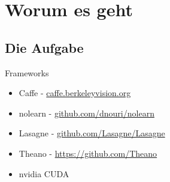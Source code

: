\section{Worum es geht}

\subsection{Die Aufgabe}


\begin{frame}{Frameworks}
    \begin{itemize}
        \item Caffe - \href{http://caffe.berkeleyvision.org/}{caffe.berkeleyvision.org}
        \item nolearn - \href{https://github.com/dnouri/nolearn}{github.com/dnouri/nolearn}
        \item Lasagne - \href{https://github.com/Lasagne/Lasagne}{github.com/Lasagne/Lasagne}
        \item Theano - \href{https://github.com/Theano/Theano}{https://github.com/Theano}
        \item nvidia CUDA
    \end{itemize}
\end{frame}